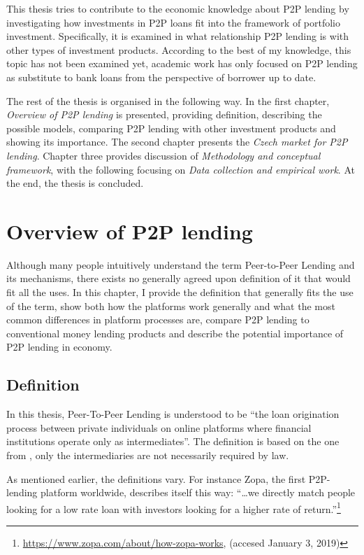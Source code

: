 This thesis tries to contribute to the economic knowledge about P2P lending by investigating how investments in P2P loans fit into the framework of portfolio investment. Specifically, it is examined in what relationship P2P lending is with other types of investment products. According to the best of my knowledge, this topic has not been examined yet, academic work has only focused on P2P lending as substitute to bank loans from the perspective of borrower up to date.

The rest of the thesis is organised in the following way. In the first chapter, \textit{Overview of P2P lending} is presented, providing definition, describing the possible models, comparing P2P lending with other investment products and showing its importance. The second chapter presents the \textit{Czech market for P2P lending}. Chapter three provides discussion of \textit{Methodology and conceptual framework}, with the following focusing on \textit{Data collection and empirical work}. At the end, the thesis is concluded.

\newpage
\section{Overview of P2P lending}
Although many people intuitively understand the term Peer-to-Peer Lending and its mechanisms, there exists no generally agreed upon definition of it that would fit all the uses. In this chapter, I provide the definition that generally fits the use of the term, show both how the platforms work generally and what the most common differences in platform processes are, compare P2P lending to conventional money lending products and describe the potential importance of P2P lending in economy.

\subsection{Definition}

In this thesis, Peer-To-Peer Lending is understood to be “the loan origination process between private individuals on online platforms where financial institutions operate only as intermediates”. The definition is based on the one from \cite{Bachmann2011}, only the intermediaries are not necessarily required by law.

As mentioned earlier, the definitions vary. For instance Zopa, the first P2P-lending platform worldwide, describes itself this way: “…we directly match people looking for a low rate loan with investors looking for a higher rate of return.”\footnote{\url{https://www.zopa.com/about/how-zopa-works}, (accesed January 3, 2019)}

